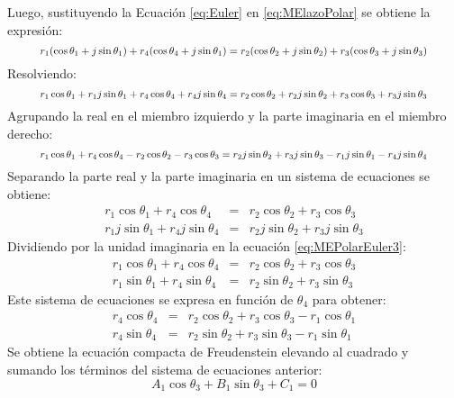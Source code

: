 Luego, sustituyendo la Ecuación \ref{eq:Euler} en \ref{eq:MElazoPolar} se obtiene la expresión:
\begin{equation}\label{eq:MEPolarEuler}
\resizebox{0.91\textwidth}{!}{
$r_1(\cos{\theta_1}+j\sin{\theta_1})+r_4(\cos{\theta_4}+j\sin{\theta_1})=r_2(\cos{\theta_2}+j\sin{\theta_2})+r_3(\cos{\theta_3}+j\sin{\theta_3})$
}
\end{equation}
Resolviendo:
\begin{equation}\label{eq:MEPolarEuler2}
\resizebox{0.91\textwidth}{!}{
$r_1 \cos{\theta_1}+r_1 j \sin{\theta_1}+r_4\cos{\theta_4}+r_4j\sin{\theta_4}=r_2\cos{\theta_2}+r_2 j\sin{\theta_2}+r_3\cos{\theta_3}+r_3j\sin{\theta_3}$
}
\end{equation}
Agrupando la real en el miembro izquierdo y la parte imaginaria en el miembro derecho:
\begin{equation}\label{eq:MEPolarEuler21}
\resizebox{0.91\textwidth}{!}{
$r_1 \cos{\theta_1}+r_4\cos{\theta_4}- r_2\cos{\theta_2}-r_3\cos{\theta_3}=r_2 j\sin{\theta_2}+r_3j\sin{\theta_3} -r_1 j \sin{\theta_1}-r_4j\sin{\theta_4}$
}
\end{equation} 
Separando la parte real y la parte imaginaria en un sistema de ecuaciones se obtiene:
\begin{eqnarray}
r_1 \cos{\theta_1}+r_4\cos{\theta_4}&=&r_2\cos{\theta_2} +r_3\cos{\theta_3} \label{eq:MEPolarEuler4} \\
r_1j\sin{\theta_1}+r_4j\sin{\theta_4} &=&r_2j\sin{\theta_2}+r_3j\sin{\theta_3}\label{eq:MEPolarEuler3}
\end{eqnarray}
Dividiendo por la unidad imaginaria en la ecuación \ref{eq:MEPolarEuler3}: 
\begin{eqnarray}
r_1 \cos{\theta_1}+r_4\cos{\theta_4}&=&r_2\cos{\theta_2} +r_3\cos{\theta_3} \label{eq:MEPolarEuler5} \\
r_1\sin{\theta_1}+r_4\sin{\theta_4} &=&r_2\sin{\theta_2}+r_3\sin{\theta_3}\label{eq:MEPolarEuler6}
\end{eqnarray}
Este sistema de ecuaciones se expresa en función de $\theta_4$ para obtener:
\begin{eqnarray}
r_4\cos{\theta_4}&=&r_2\cos{\theta_2} +r_3\cos{\theta_3}-r_1 \cos{\theta_1}\label{eq:MEPolarEuler7} \\
r_4\sin{\theta_4} &=&r_2\sin{\theta_2}+r_3\sin{\theta_3}-r_1\sin{\theta_1}\label{eq:MEPolarEuler8}
\end{eqnarray}
Se obtiene la ecuación compacta de Freudenstein elevando al cuadrado y sumando los términos
del sistema de ecuaciones anterior:
\begin{equation} \label{eq:A1B1C1}
 A_1\cos{\theta_3}+B_1\sin{\theta_3}+C_1=0 
\end{equation}
